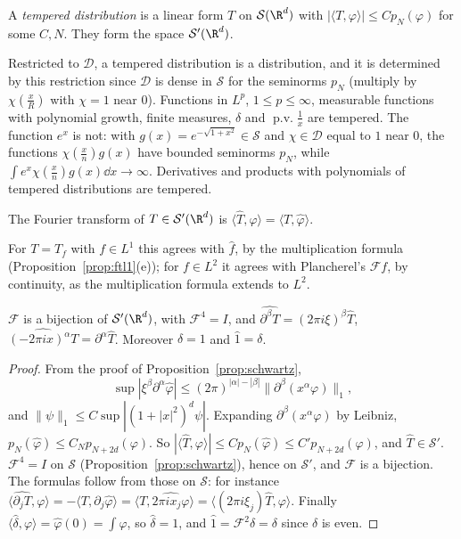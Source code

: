 \begin{definition}
A \emph{tempered distribution} is a linear form $T$ on $\mathcal S(\R^d)$ with $|\langle T,\varphi\rangle|\le Cp_N(\varphi)$ for some $C,N$. They form the space $\mathcal S'(\R^d)$.
\end{definition}

Restricted to $\mathcal D$, a tempered distribution is a distribution, and it is determined by this restriction since $\mathcal D$ is dense in $\mathcal S$ for the seminorms $p_N$ (multiply by $\chi(\frac xR)$ with $\chi=1$ near $0$). Functions in
$L^p$, $1\le p\le\infty$, measurable functions with polynomial growth, finite measures, $\delta$ and $\operatorname{p.v.}\frac1x$ are tempered. The function $e^x$ is not: with $g(x)=e^{-\sqrt{1+x^2}}\in\mathcal S$ and $\chi\in\mathcal D$ equal to $1$ near $0$, the functions $\chi(\frac xn)g(x)$ have bounded
seminorms $p_N$, while $\int e^x\chi(\frac xn)g(x)\dd x\to\infty$. Derivatives and products with polynomials of tempered distributions are tempered.

\begin{definition}
The Fourier transform of $T\in\mathcal S'(\R^d)$ is $\langle\hat T,\varphi\rangle=\langle T,\hat\varphi\rangle$.
\end{definition}

For $T=T_f$ with $f\in L^1$ this agrees with $\hat f$, by the multiplication formula (Proposition~\ref{prop:ftl1}(e)); for $f\in L^2$ it agrees with Plancherel's $\mathcal Ff$, by continuity, as the multiplication formula extends to $L^2$.

\begin{theorem}\label{thm:ftsprime}
$\mathcal F$ is a bijection of $\mathcal S'(\R^d)$, with $\mathcal F^4=I$, and $\widehat{\partial^\beta T}=(2\pi i\xi)^\beta\hat T$, $\widehat{(-2\pi ix)^\alpha T}=\partial^\alpha\hat T$. Moreover $\hat\delta=1$ and $\hat1=\delta$.
\end{theorem}
\begin{proof}
From the proof of Proposition~\ref{prop:schwartz},
\[\sup|\xi^\beta\partial^\alpha\hat\varphi|\le(2\pi)^{|\alpha|-|\beta|}\|\partial^\beta(x^\alpha\varphi)\|_1,\]
and $\|\psi\|_1\le C\sup|(1+|x|^2)^d\psi|$. Expanding $\partial^\beta(x^\alpha\varphi)$ by Leibniz, $p_N(\hat\varphi)\le C_Np_{N+2d}(\varphi)$. So
$|\langle\hat T,\varphi\rangle|\le Cp_N(\hat\varphi)\le C'p_{N+2d}(\varphi)$, and $\hat T\in\mathcal S'$. $\mathcal F^4=I$ on $\mathcal S$ (Proposition~\ref{prop:schwartz}), hence on $\mathcal S'$, and $\mathcal F$ is a bijection. The formulas follow from those on
$\mathcal S$: for instance $\langle\widehat{\partial_jT},\varphi\rangle=-\langle T,\partial_j\hat\varphi\rangle=\langle T,\widehat{2\pi ix_j\varphi}\rangle=\langle(2\pi i\xi_j)\hat T,\varphi\rangle$. Finally $\langle\hat\delta,\varphi\rangle=\hat\varphi(0)=\int\varphi$, so
$\hat\delta=1$, and $\hat1=\mathcal F^2\delta=\delta$ since $\delta$ is even.
\end{proof}

